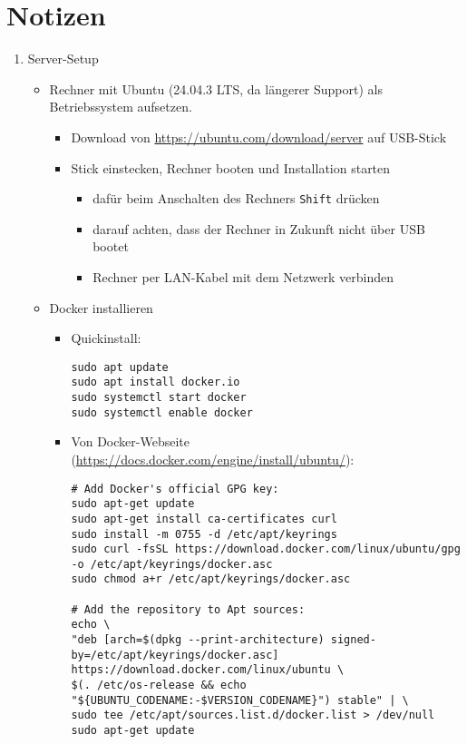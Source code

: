 \documentclass[12pt,a4paper]{report}
\begin{document}
\section{Notizen}

\begin{enumerate}
  \item Server-Setup
    \begin{itemize}
      \item Rechner mit Ubuntu (24.04.3 LTS, da längerer Support) als Betriebssystem aufsetzen.
        \begin{itemize}
          \item Download von \url{https://ubuntu.com/download/server} auf USB-Stick
          \item Stick einstecken, Rechner booten und Installation starten
            \begin{itemize}
              \item dafür beim Anschalten des Rechners \texttt{Shift} drücken
              \item darauf achten, dass der Rechner in Zukunft nicht über USB bootet
              \item Rechner per LAN-Kabel mit dem Netzwerk verbinden
            \end{itemize}
        \end{itemize}

      \item Docker installieren
        \begin{itemize}
          \item Quickinstall:
          \begin{verbatim}
sudo apt update
sudo apt install docker.io
sudo systemctl start docker
sudo systemctl enable docker
          \end{verbatim}

          \item Von Docker-Webseite (\url{https://docs.docker.com/engine/install/ubuntu/}):
          \begin{verbatim}
# Add Docker's official GPG key:
sudo apt-get update
sudo apt-get install ca-certificates curl
sudo install -m 0755 -d /etc/apt/keyrings
sudo curl -fsSL https://download.docker.com/linux/ubuntu/gpg -o /etc/apt/keyrings/docker.asc
sudo chmod a+r /etc/apt/keyrings/docker.asc

# Add the repository to Apt sources:
echo \
"deb [arch=$(dpkg --print-architecture) signed-by=/etc/apt/keyrings/docker.asc] https://download.docker.com/linux/ubuntu \
$(. /etc/os-release && echo "${UBUNTU_CODENAME:-$VERSION_CODENAME}") stable" | \
sudo tee /etc/apt/sources.list.d/docker.list > /dev/null
sudo apt-get update
          \end{verbatim}


\end{itemize}
\end{itemize}
\end{enumerate}
\end{document}
